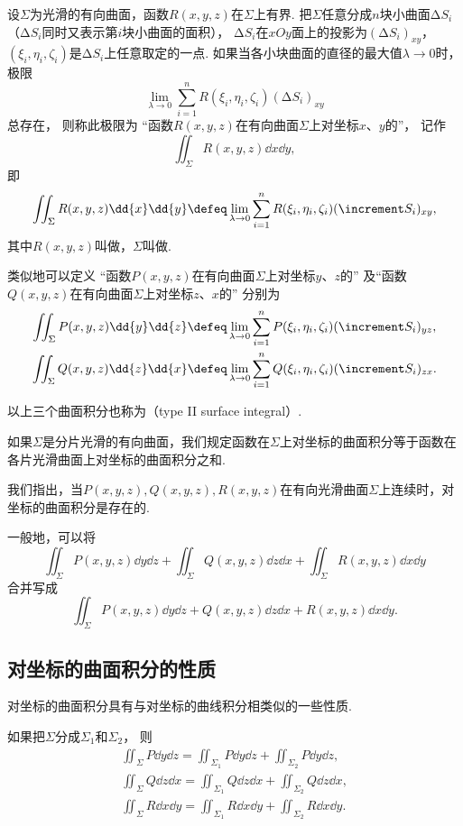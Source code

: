 设\(\Sigma\)为光滑的有向曲面，函数\(R(x,y,z)\)在\(\Sigma\)上有界.
把\(\Sigma\)任意分成\(n\)块小曲面\(\increment S_i\)
（\(\increment S_i\)同时又表示第\(i\)块小曲面的面积），
\(\increment S_i\)在\(xOy\)面上的投影为\((\increment S_i)_{xy}\)，
\((\xi_i,\eta_i,\zeta_i)\)是\(\increment S_i\)上任意取定的一点.
如果当各小块曲面的直径的最大值\(\lambda\to0\)时，极限\[
	\lim_{\lambda\to0}
	\sum_{i=1}^n
	R(\xi_i,\eta_i,\zeta_i)
	(\increment S_i)_{xy}
\]总存在，
则称此极限为
“函数\(R(x,y,z)\)在有向曲面\(\Sigma\)上对坐标\(x\)、\(y\)的”，
记作\[
	\iint_\Sigma R(x,y,z) \dd{x}\dd{y},
\]
即\[
	\iint_\Sigma R(x,y,z) \dd{x}\dd{y}
	\defeq
	\lim_{\lambda\to0}
	\sum_{i=1}^n
	R(\xi_i,\eta_i,\zeta_i)
	(\increment S_i)_{xy},
\]
其中\(R(x,y,z)\)叫做，\(\Sigma\)叫做.

类似地可以定义
“函数\(P(x,y,z)\)在有向曲面\(\Sigma\)上对坐标\(y\)、\(z\)的”
及“函数\(Q(x,y,z)\)在有向曲面\(\Sigma\)上对坐标\(z\)、\(x\)的”
分别为\begin{gather*}
	\iint_\Sigma P(x,y,z) \dd{y}\dd{z}
	\defeq
	\lim_{\lambda\to0}
	\sum_{i=1}^n P(\xi_i,\eta_i,\zeta_i) (\increment S_i)_{yz}, \\
	\iint_\Sigma Q(x,y,z) \dd{z}\dd{x}
	\defeq
	\lim_{\lambda\to0}
	\sum_{i=1}^n Q(\xi_i,\eta_i,\zeta_i) (\increment S_i)_{zx}.
\end{gather*}

以上三个曲面积分也称为（type II surface integral）.

如果\(\Sigma\)是分片光滑的有向曲面，我们规定函数在\(\Sigma\)上对坐标的曲面积分等于函数在各片光滑曲面上对坐标的曲面积分之和.

我们指出，当\(P(x,y,z),Q(x,y,z),R(x,y,z)\)在有向光滑曲面\(\Sigma\)上连续时，对坐标的曲面积分是存在的.

一般地，可以将\[
	\iint_\Sigma P(x,y,z) \dd{y}\dd{z}
	+\iint_\Sigma Q(x,y,z) \dd{z}\dd{x}
	+\iint_\Sigma R(x,y,z) \dd{x}\dd{y}
\]合并写成\[
	\iint_\Sigma P(x,y,z)\dd{y}\dd{z}+Q(x,y,z)\dd{z}\dd{x}+R(x,y,z)\dd{x}\dd{y}.
\]

\subsection{对坐标的曲面积分的性质}
对坐标的曲面积分具有与对坐标的曲线积分相类似的一些性质.
\begin{property}
如果把\(\Sigma\)分成\(\Sigma_1\)和\(\Sigma_2\)，
则\begin{gather}
	\iint_\Sigma P\dd{y}\dd{z}
	=\iint_{\Sigma_1} P\dd{y}\dd{z}
	+\iint_{\Sigma_2} P\dd{y}\dd{z}, \\
	\iint_\Sigma Q\dd{z}\dd{x}
	=\iint_{\Sigma_1} Q\dd{z}\dd{x}
	+\iint_{\Sigma_2} Q\dd{z}\dd{x}, \\
	\iint_\Sigma R\dd{x}\dd{y}
	=\iint_{\Sigma_1} R\dd{x}\dd{y}
	+\iint_{\Sigma_2} R\dd{x}\dd{y}.
\end{gather}
\end{property}

